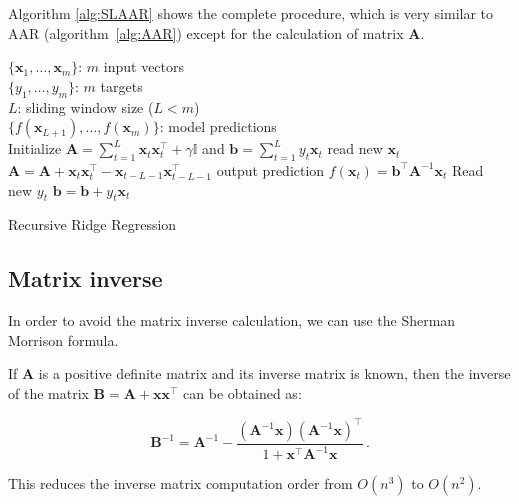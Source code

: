 Algorithm \ref{alg:SLAAR} shows the complete procedure, which is very similar
to AAR (algorithm~\ref{alg:AAR}) except for the calculation of matrix
$\mathbf{A}$. 


\begin{algorithm}[ht]
\begin{algorithmic}[1]
\REQUIRE $\,$ \\
$\{\mathbf{x}_1,\dots,\mathbf{x}_m \}$: $m$ input vectors \\
$\{y_1,\dots,y_m \}$: $m$ targets \\
$L$: sliding window size ($L<m$) \\
\ENSURE  $\,$ \\
$\{f(\mathbf{x}_{L+1}),\dots,f(\mathbf{x}_m) \}$: model predictions \\
\STATE Initialize $\mathbf{A}=\displaystyle \sum_{t=1}^L \mathbf{x}_t
\mathbf{x}_t^\intercal + \gamma \mathbb{I}$
and $\mathbf{b}=\displaystyle \sum_{t=1}^Ly_t \mathbf{x}_t$
        \STATE read new $\mathbf{x}_t$
        \STATE $\mathbf{A} = \mathbf{A} + \mathbf{x}_t \mathbf{x}_t^\intercal-
\mathbf{x}_{t-L-1} \mathbf{x}_{t-L-1}^\intercal  $
        \STATE output prediction $f(\mathbf{x}_t) =  \mathbf{b}^\intercal
\mathbf{A}^{-1}\mathbf{x}_t$
        \STATE Read new $y_t$
        \STATE $\mathbf{b} = \mathbf{b} + y_t \mathbf{x}_t$
\ENDFOR

\end{algorithmic}
\caption{Recursive Ridge Regression}
\label{alg:SLAAR}
\end{algorithm}



\subsection{Matrix inverse}

In order to avoid the matrix inverse calculation, we can use the
Sherman Morrison formula.

If $\mathbf{A}$ is a positive definite matrix and its inverse matrix
is known, then the inverse of the matrix $\mathbf{B}=\mathbf{A} +
\mathbf{x}\mathbf{x}^\intercal$ can be obtained as: 

\begin{equation*}
\mathbf{B}^{-1} = \mathbf{A}^{-1} -
\frac{(\mathbf{A}^{-1}\mathbf{x})(\mathbf{A}^{-1}\mathbf{x})^{\intercal}}
{1 + \mathbf{x}^{\intercal} \mathbf{A}^{-1} \mathbf{x}} \, .
\end{equation*}

This reduces the inverse matrix
computation order from $O(n^3)$ to $O(n^2)$.


